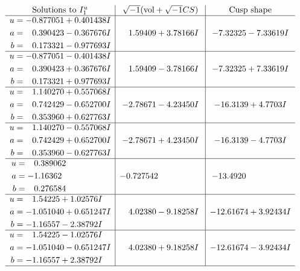 \documentclass[1p]{elsarticle_modified}
\theoremstyle{definition}
\newcommand{\I}{\sqrt{-1}}
\begin{document}
$$\begin{array}{c|c|c}  
\text{Solutions to }I^u_{1}& \I (\text{vol} + \sqrt{-1}CS) & \text{Cusp shape}\\
 \hline 
\begin{aligned}
u &= -0.877051 + 0.401438 I \\
a &= \phantom{-}0.390423 - 0.367676 I \\
b &= \phantom{-}0.173321 - 0.977693 I\end{aligned}
 & \phantom{-}1.59409 + 3.78166 I & -7.32325 - 7.33619 I \\ \hline\begin{aligned}
u &= -0.877051 - 0.401438 I \\
a &= \phantom{-}0.390423 + 0.367676 I \\
b &= \phantom{-}0.173321 + 0.977693 I\end{aligned}
 & \phantom{-}1.59409 - 3.78166 I & -7.32325 + 7.33619 I \\ \hline\begin{aligned}
u &= \phantom{-}1.140270 + 0.557068 I \\
a &= \phantom{-}0.742429 - 0.652700 I \\
b &= \phantom{-}0.353960 + 0.627763 I\end{aligned}
 & -2.78671 - 4.23450 I & -16.3139 + 4.7703 I \\ \hline\begin{aligned}
u &= \phantom{-}1.140270 - 0.557068 I \\
a &= \phantom{-}0.742429 + 0.652700 I \\
b &= \phantom{-}0.353960 - 0.627763 I\end{aligned}
 & -2.78671 + 4.23450 I & -16.3139 - 4.7703 I \\ \hline\begin{aligned}
u &= \phantom{-}0.389062\phantom{ +0.000000I} \\
a &= -1.16362\phantom{ +0.000000I} \\
b &= \phantom{-}0.276584\phantom{ +0.000000I}\end{aligned}
 & -0.727542\phantom{ +0.000000I} & -13.4920\phantom{ +0.000000I} \\ \hline\begin{aligned}
u &= \phantom{-}1.54225 + 1.02576 I \\
a &= -1.051040 + 0.651247 I \\
b &= -1.16557 - 2.38792 I\end{aligned}
 & \phantom{-}4.02380 - 9.18258 I & -12.61674 + 3.92434 I \\ \hline\begin{aligned}
u &= \phantom{-}1.54225 - 1.02576 I \\
a &= -1.051040 - 0.651247 I \\
b &= -1.16557 + 2.38792 I\end{aligned}
 & \phantom{-}4.02380 + 9.18258 I & -12.61674 - 3.92434 I\\
 \hline 
 \end{array}$$\newpage\newpage\renewcommand{\arraystretch}{1}
\end{document}

